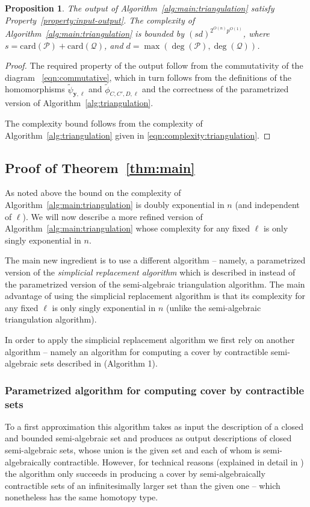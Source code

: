 \documentclass{amsart}[10pts]
\newtheorem{proposition}{Proposition}[section]
\theoremstyle{definition}
\theoremstyle{remark}
\theoremstyle{observation}
\numberwithin{equation}{section}
\newcommand{\card}{\mathrm{card}}
\newcommand{\y}{\mathbf{y}}
\begin{document}
\begin{proposition}
    The output of Algorithm~\ref{alg:main:triangulation} satisfy Property~\ref{property:input-output}. 
    The complexity of Algorithm~\ref{alg:main:triangulation} is bounded by $(sd)^{2^{O(n)}p^{O(1)}}$,
    where $s = \card(\mathcal{P}) + \card(\mathcal{Q})$, and 
    $d = \max(\deg(\mathcal{P}),\deg(\mathcal{Q}))$.
\end{proposition}

\begin{proof}
    The required property of the output follow from the commutativity of the diagram ~\eqref{eqn:commutative}, which in turn follows from the definitions of the homomorphisms $\widetilde{\psi}_{\y,\ell}$ and 
    $\widetilde{\phi}_{C,C',D,\ell}$ and the correctness of the parametrized version of Algorithm~\ref{alg:triangulation}.

    The complexity bound follows from the complexity of Algorithm~\ref{alg:triangulation} given in \eqref{eqn:complexity:triangulation}.
    \end{proof}

\subsection{Proof of Theorem~\ref{thm:main}%
}
As noted above the bound on the complexity of Algorithm~\ref{alg:main:triangulation} is doubly exponential in $n$ 
(and independent of $\ell$). We will now describe a more refined version
of Algorithm~\ref{alg:main:triangulation} whose complexity for any fixed $\ell$ is only singly exponential in $n$.

\medskip
The main new ingredient is to use a different algorithm -- namely, a parametrized version of the \emph{simplicial replacement algorithm} which is described in \cite{Basu-Karisani-1} instead of the parametrized version of the semi-algebraic triangulation algorithm. The main advantage of using the simplicial replacement algorithm is that its complexity for any fixed $\ell$ is only singly exponential in $n$ (unlike the semi-algebraic triangulation algorithm).

\medskip
In order to apply the simplicial replacement algorithm we first rely on another algorithm -- namely 
an algorithm for computing a cover by contractible semi-algebraic sets described in  \cite{Basu-Karisani-1} (Algorithm 1).

\subsubsection{Parametrized algorithm for computing cover by contractible sets}
To a first approximation this algorithm takes as input the description of a closed and bounded semi-algebraic set and produces as output 
descriptions of closed semi-algebraic sets, whose union is the given set and each of whom is semi-algebraically contractible. 
However, for technical reasons (explained in detail in \cite{Basu-Karisani-1}) the algorithm only succeeds in producing a cover by
semi-algebraically contractible sets of an infinitesimally larger
set than the given one -- which nonetheless has the same homotopy type.
\end{document}
